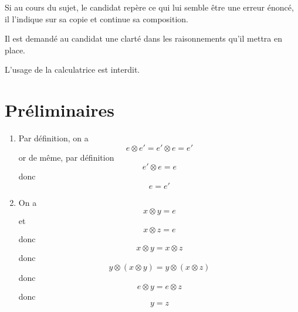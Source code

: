 


\newcommand{\covec}[2]{\begin{pmatrix}#1 \\#2 \end{pmatrix}}


\flushleft
Si au cours du sujet, le candidat repère ce qui lui semble être une erreur énoncé, il l'indique sur sa copie et continue sa composition. \newline

Il est demandé au candidat une clarté dans les raisonnements qu'il mettra en place. \newline

L'usage de la calculatrice est interdit.\newline
\section{Préliminaires}
\begin{enumerate}
\item Par définition, on a $$e \otimes e' = e'\otimes e = e'$$ or de même, par définition $$e'\otimes e = e$$ donc $$\boxed{e = e'}$$
\item On a $$x\otimes y =e$$ et $$x\otimes z = e$$ donc $$x\otimes y = x\otimes z$$ donc $$y\otimes(x\otimes y) = y\otimes(x\otimes z)$$ donc $$e\otimes y = e\otimes z$$ donc $$\boxed{y = z}$$
\end{enumerate}
